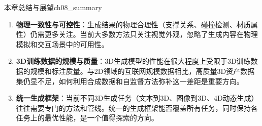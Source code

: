 \begin{futurebox}{本章总结与展望}{ch08_summary}
\begin{enumerate}
\item \textbf{物理一致性与可控性}：生成结果的物理合理性（支撑关系、碰撞检测、材质属性）仍需更多关注。当前大多数方法只关注视觉外观，忽略了生成内容在物理模拟和交互场景中的可用性。

\item \textbf{3D训练数据的规模与质量}：3D生成模型的性能在很大程度上受限于3D训练数据的规模和标注质量。与2D领域的互联网规模数据相比，高质量3D资产数据集仍显不足，如何利用合成数据和自监督方法弥补这一差距是重要方向。

\item \textbf{统一生成框架}：当前不同3D生成任务（文本到3D、图像到3D、4D动态生成）往往需要专门的方法和管线。统一的生成框架能否覆盖所有任务，同时保持各任务上的最优性能，是一个值得探索的方向。
\end{enumerate}

\end{futurebox}
